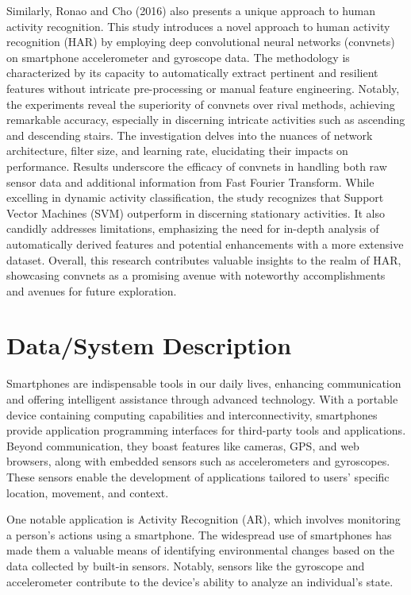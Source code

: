 \documentclass[conference]{IEEEtran}
\begin{document}
Similarly, Ronao and Cho (2016) also presents a unique approach to human activity recognition. This study introduces a novel approach to human activity recognition (HAR) by employing deep convolutional neural networks (convnets) on smartphone accelerometer and gyroscope data. The methodology is characterized by its capacity to automatically extract pertinent and resilient features without intricate pre-processing or manual feature engineering. Notably, the experiments reveal the superiority of convnets over rival methods, achieving remarkable accuracy, especially in discerning intricate activities such as ascending and descending stairs. The investigation delves into the nuances of network architecture, filter size, and learning rate, elucidating their impacts on performance. Results underscore the efficacy of convnets in handling both raw sensor data and additional information from Fast Fourier Transform. While excelling in dynamic activity classification, the study recognizes that Support Vector Machines (SVM) outperform in discerning stationary activities. It also candidly addresses limitations, emphasizing the need for in-depth analysis of automatically derived features and potential enhancements with a more extensive dataset. Overall, this research contributes valuable insights to the realm of HAR, showcasing convnets as a promising avenue with noteworthy accomplishments and avenues for future exploration. \newline 



\section{Data/System Description}
Smartphones are indispensable tools in our daily lives, enhancing communication and offering intelligent assistance through advanced technology. With a portable device containing computing capabilities and interconnectivity, smartphones provide application programming interfaces for third-party tools and applications. Beyond communication, they boast features like cameras, GPS, and web browsers, along with embedded sensors such as accelerometers and gyroscopes. These sensors enable the development of applications tailored to users' specific location, movement, and context.

One notable application is Activity Recognition (AR), which involves monitoring a person's actions using a smartphone. The widespread use of smartphones has made them a valuable means of identifying environmental changes based on the data collected by built-in sensors. Notably, sensors like the gyroscope and accelerometer contribute to the device's ability to analyze an individual's state.
\end{document}
